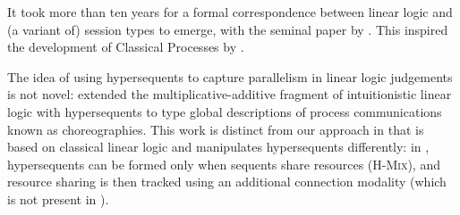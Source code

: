 \documentclass[submission,copyright,creativecommons]{eptcs}
\begin{document}
It took more than ten years for a formal correspondence between linear logic and (a variant of) session types to emerge, with the seminal paper by \citet{caires2010}. This inspired the development of Classical Processes by \citet{wadler2012}.

The idea of using hypersequents to capture parallelism in linear logic judgements is not novel: \citet{carbone2018} extended the multiplicative-additive fragment of intuitionistic linear logic with hypersequents to type global descriptions of process communications known as choreographies. This work is distinct from our approach in that \hcp is based on classical linear logic and manipulates hypersequents differently: in \citet{carbone2018}, hypersequents can be formed only when sequents share resources (\cf \textsc{H-Mix}), and resource sharing is then tracked using an additional connection modality (which is not present in \hcp).

\clearpage


\end{document}
